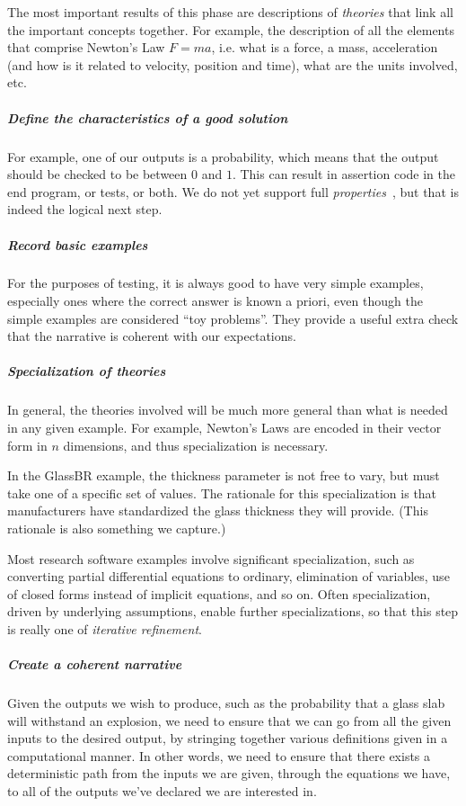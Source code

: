 \documentclass[a4paper,UKenglish,cleveref,autoref,thm-restate]{oasics-v2021}
\begin{document}
The most important results of this phase are descriptions of \emph{theories}
that link all the important concepts together. For example, the description
of all the elements that comprise Newton's Law $F = m a$,
i.e. what is a force, a mass, acceleration (and how is it related to
velocity, position and time), what are the units involved, etc.

\subparagraph*{Define the characteristics of a good solution}
For example, one of our outputs is a probability, which means that the output
should be checked to be between \(0\) and \(1\). This can result
in assertion code in the end program, or tests, or both. We do not yet
support full \emph{properties}~\cite{claessen2000quickcheck}, but that is
indeed the logical next step.

\subparagraph*{Record basic examples}
For the purposes of testing, it is always good to have very simple examples,
especially ones where the correct answer is known a priori, even though the simple
examples are considered ``toy problems''. They provide a useful extra check
that the narrative is coherent with our expectations.

\subparagraph*{Specialization of theories}
In general, the theories involved will be much more general than what is
needed in any given example. For example, Newton's Laws are encoded in their
vector form in $n$ dimensions, and thus specialization is necessary.

In the GlassBR example, the thickness parameter
is not free to vary, but must take one of a specific set of values. The
rationale for this specialization is that manufacturers have standardized the
glass thickness they will provide. (This rationale is also something we capture.)

Most research software examples involve significant specialization, such as
converting partial differential equations to ordinary, elimination of
variables, use of closed forms instead of implicit equations, and so on.
Often specialization, driven by underlying assumptions, enable further
specializations, so that this step is really one of \emph{iterative refinement}.

\subparagraph*{Create a coherent narrative}
Given the outputs we wish to produce, such as the probability that a glass
slab will withstand an explosion, we need to ensure that we can go from all
the given inputs to the desired output, by stringing together various
definitions given in a computational manner. In other words, we need to
ensure that there exists a deterministic path from the inputs we are given,
through the equations we have, to all of the outputs we've declared we are
interested in.
\end{document}
